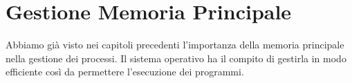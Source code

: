 
\chapter{Gestione Memoria Principale}
Abbiamo già visto nei capitoli precedenti l'importanza della memoria principale nella gestione dei processi. Il sistema operativo ha il compito di gestirla in modo efficiente così da permettere l'esecuzione dei programmi.








